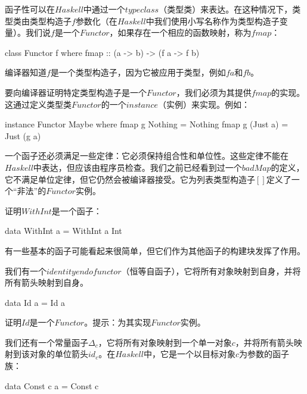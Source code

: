 \documentclass[DaoFP]{subfiles}
\begin{document}
    函子性可以在$Haskell$中通过一个$typeclass$（类型类）来表达。在这种情况下，类型类由类型构造子$f$参数化（在$Haskell$中我们使用小写名称作为类型构造子变量）。我们说$f$是一个$Functor$，如果存在一个相应的函数映射，称为$fmap$：

    \begin{haskell}
        class Functor f where
        fmap :: (a -> b) -> (f a -> f b)
    \end{haskell}

    编译器知道$f$是一个类型构造子，因为它被应用于类型，例如$f a$和$f b$。

    要向编译器证明特定类型构造子是一个$Functor$，我们必须为其提供$fmap$的实现。这通过定义类型类$Functor$的一个$instance$（实例）来实现。例如：

    \begin{haskell}
        instance Functor Maybe where
        fmap g Nothing  = Nothing
        fmap g (Just a) = Just (g a)
    \end{haskell}

    一个函子还必须满足一些定律：它必须保持组合性和单位性。这些定律不能在$Haskell$中表达，但应该由程序员检查。我们之前已经看到过一个$badMap$的定义，它不满足单位定律，但它仍然会被编译器接受。它为列表类型构造子$[]$定义了一个“非法”的$Functor$实例。

    \begin{exercise}
        证明$WithInt$是一个函子：
        \begin{haskell}
            data WithInt a = WithInt a Int
        \end{haskell}
    \end{exercise}

    有一些基本的函子可能看起来很简单，但它们作为其他函子的构建块发挥了作用。

    我们有一个$identity endofunctor$（恒等自函子），它将所有对象映射到自身，并将所有箭头映射到自身。

    \begin{haskell}
        data Id a = Id a
    \end{haskell}

    \begin{exercise}
        证明$Id$是一个$Functor$。提示：为其实现$Functor$实例。
    \end{exercise}

    我们还有一个常量函子$\Delta_c$，它将所有对象映射到一个单一对象$c$，并将所有箭头映射到该对象的单位箭头$id_c$。在$Haskell$中，它是一个以目标对象$c$为参数的函子族：

    \begin{haskell}
        data Const c a = Const c
    \end{haskell}
\end{document}
